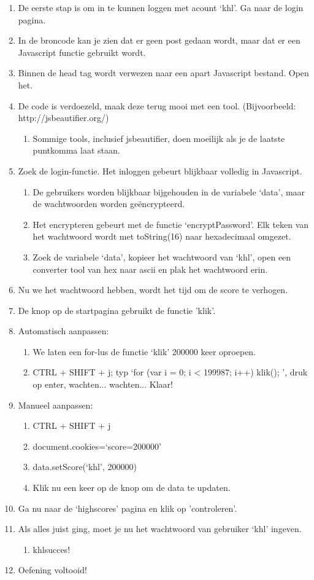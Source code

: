\begin{enumerate}
  \item De eerste stap is om in te kunnen loggen met acount `khl'. Ga naar de login pagina.
  \item In de broncode kan je zien dat er geen post gedaan wordt, maar dat er een Javascript functie gebruikt wordt.
  \item Binnen de head tag wordt verwezen naar een apart Javascript bestand. Open het.
  \item De code is verdoezeld, maak deze terug mooi met een tool. (Bijvoorbeeld: http://jsbeautifier.org/)
   \begin{enumerate}
   \item Sommige tools, inclusief jsbeautifier, doen moeilijk als je de laatste puntkomma laat staan.
   \end{enumerate}
  \item Zoek de login-functie. Het inloggen gebeurt blijkbaar volledig in Javascript.
   \begin{enumerate}
   \item De gebruikers worden blijkbaar bijgehouden in de variabele `data', maar de wachtwoorden worden geëncrypteerd.
   \item Het encrypteren gebeurt met de functie `encryptPassword'. Elk teken van het wachtwoord wordt met toString(16) naar hexadecimaal omgezet.
\item Zoek de variabele `data', kopieer het wachtwoord van `khl', open een converter tool van hex naar ascii en plak het wachtwoord erin.
   \end{enumerate}
  \item Nu we het wachtwoord hebben, wordt het tijd om de score te verhogen.
  \item De knop op de startpagina gebruikt de functie 'klik'.
  \item Automatisch aanpassen:
  \begin{enumerate}
  \item We laten een for-lus de functie `klik' 200000 keer oproepen.
  \item CTRL + SHIFT + j; typ `for (var i = 0; i < 199987; i++) { klik(); }', druk op enter, wachten... wachten... Klaar!
   \end{enumerate}
  \item Manueel aanpassen:
   \begin{enumerate}
   \item CTRL + SHIFT + j
   \item document.cookies=`score=200000'
   \item data.setScore(`khl', 200000)
   \item Klik nu een keer op de knop om de data te updaten.
   \end{enumerate}
  \item Ga nu naar de `highscores' pagina en klik op 'controleren'.
  \item Als alles juist ging, moet je nu het wachtwoord van gebruiker `khl' ingeven.
     \begin{enumerate}
  \item khlsucces!
  \end{enumerate}
  \item Oefening voltooid!
\end{enumerate}